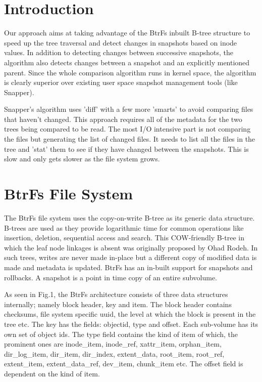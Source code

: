 \documentclass[final]{ols}
\begin{document}
\section{Introduction}\label{lockhart-Introduction}
Our approach aims at taking advantage of the BtrFs inbuilt B-tree structure to speed up the tree traversal and detect changes in snapshots based on inode values. In addition to detecting changes between successive snapshots, the algorithm also detects changes between a snapshot and an explicitly mentioned parent. Since the whole comparison algorithm runs in kernel space, the algorithm is clearly superior over existing user space snapshot management tools (like Snapper).

Snapper's algorithm uses 'diff' with a few more 'smarts' to avoid comparing files that haven't changed. This approach requires all of the metadata for the two trees being compared to be read. The most I/O intensive part is not comparing the files but generating the list of changed files. It needs to list all the files in the tree and 'stat' them to see if they have changed between the snapshots. This is slow and only gets slower as the file system grows.

\section{BtrFs File System}\label{lockhart-BtrFsArchitecture}
The BtrFs file system uses the copy-on-write B-tree as its generic data structure. B-trees are used as they provide logarithmic time for common operations like insertion, deletion, sequential access and search. This COW-friendly B-tree in which the leaf node linkages is absent was originally proposed by Ohad Rodeh. In such trees, writes are never made in-place but a different copy of modified data is made and metadata is updated. BtrFs has an in-built support for snapshots and rollbacks. A snapshot is a point in time copy of an entire subvolume.

As seen in Fig.1, the BtrFs architecture consists of three data structures internally; namely block header, key and item. The block header contains checksums, file system specific uuid, the level at which the block is present in the tree etc. The key has the fields: objectid, type and offset. Each sub-volume has its own set of object ids. The type field contains the kind of item of which, the prominent ones are inode\_item, inode\_ref, xattr\_item, orphan\_item, dir\_log\_item, dir\_item, dir\_index, extent\_data, root\_item, root\_ref, extent\_item, extent\_data\_ref, dev\_item, chunk\_item etc. The offset field is dependent on the kind of item.
\end{document}
